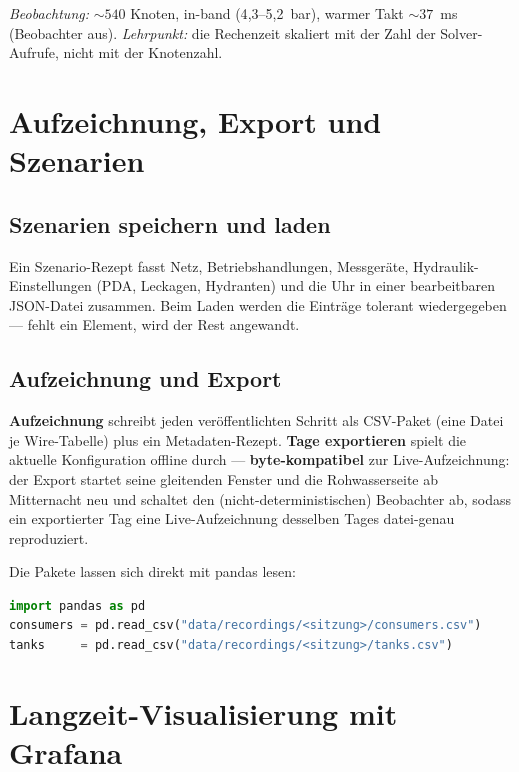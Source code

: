 \documentclass[11pt,a4paper,parskip=half]{scrreprt}
\newcommand{\ui}[1]{\textsf{\bfseries #1}}      %
\begin{document}
\begin{beispiel}
\emph{Beobachtung:} $\sim540$ Knoten, in-band (4{,}3--5{,}2~bar), warmer Takt
$\sim37$~ms (Beobachter aus). \emph{Lehrpunkt:} die Rechenzeit skaliert mit der
Zahl der Solver-Aufrufe, nicht mit der Knotenzahl.
\end{beispiel}

\chapter{Aufzeichnung, Export und Szenarien}
\label{ch:export}

\section{Szenarien speichern und laden}
Ein Szenario-Rezept fasst Netz, Betriebshandlungen, Messgeräte, Hydraulik-Einstellungen
(PDA, Leckagen, Hydranten) und die Uhr in einer bearbeitbaren JSON-Datei zusammen.
Beim Laden werden die Einträge tolerant wiedergegeben — fehlt ein Element, wird der
Rest angewandt.

\section{Aufzeichnung und Export}
\ui{Aufzeichnung} schreibt jeden veröffentlichten Schritt als
CSV-Paket (eine Datei je Wire-Tabelle) plus ein Metadaten-Rezept. \ui{Tage
exportieren} spielt die aktuelle Konfiguration offline durch — \textbf{byte-kompatibel}
zur Live-Aufzeichnung: der Export startet seine gleitenden Fenster und die
Rohwasserseite ab Mitternacht neu und schaltet den (nicht-deterministischen)
Beobachter ab, sodass ein exportierter Tag eine Live-Aufzeichnung desselben Tages
datei-genau reproduziert.

\begin{beispiel}
Die Pakete lassen sich direkt mit pandas lesen:
\begin{lstlisting}[language=Python]
import pandas as pd
consumers = pd.read_csv("data/recordings/<sitzung>/consumers.csv")
tanks     = pd.read_csv("data/recordings/<sitzung>/tanks.csv")
\end{lstlisting}
\end{beispiel}

\chapter{Langzeit-Visualisierung mit Grafana}
\label{ch:grafana}
\end{document}
